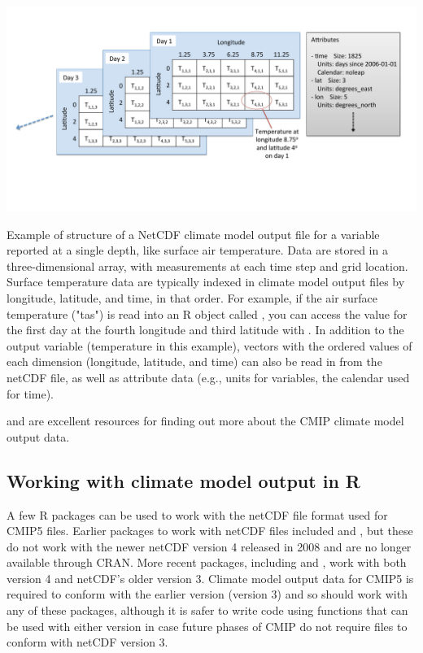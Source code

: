 \begin{widefigure}
\begin{center}
\includegraphics[width = \textwidth]{netcdf_figure}
\end{center}
\caption{Example of structure of a NetCDF climate model output file for a variable reported at a single depth, like surface air temperature. Data are stored in a three-dimensional array, with measurements at each time step and grid location. Surface temperature data are typically indexed in climate model output files by longitude, latitude, and time, in that order. For example, if the air surface temperature ("tas") is read into an R object called , you can access the value for the first day at the fourth longitude and third latitude with . In addition to the output variable (temperature in this example), vectors with the ordered values of each dimension (longitude, latitude, and time) can also be read in from the netCDF file, as well as attribute data (e.g., units for variables, the calendar used for time).}
\label{fig:netcdfexample}
\end{widefigure}

\citet{taylor2012overview} and \citet{meehl2007wcrp} are excellent
resources for finding out more about the CMIP climate model output data.

\subsection{Working with climate model output in
R}\label{working-with-climate-model-output-in-r}

A few R packages can be used to work with the netCDF file format used
for CMIP5 files. Earlier packages to work with netCDF files included
 and , but these do not work with the newer netCDF
version 4 released in 2008 and are no longer available through CRAN.
More recent packages, including  \citep{ncdf4} and
 \citep{michna2013rnetcdf, RNetCDF}, work with both version
4 and netCDF's older version 3. Climate model output data for CMIP5 is
required to conform with the earlier version (version 3)
\citep{taylor2010cmip5} and so should work with any of these packages,
although it is safer to write code using functions that can be used with
either version in case future phases of CMIP do not require files to
conform with netCDF version 3.

